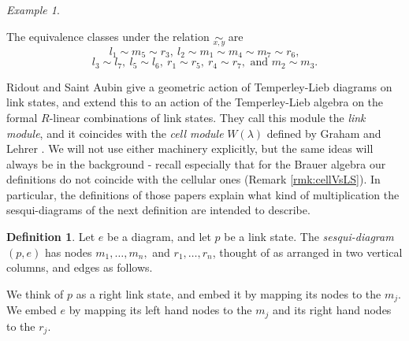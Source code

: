 \documentclass[12pt]{amsart}
\theoremstyle{plain}
\theoremstyle{definition} \newtheorem{definition}[theorem]{Definition}
\theoremstyle{plain}
\theoremstyle{plain} \newtheorem{proposition}[theorem]{Proposition}
\theoremstyle{plain} \newtheorem{conjecture}[theorem]{Conjecture}
\theoremstyle{plain} \newtheorem{corollary}[theorem]{Corollary}
\theoremstyle{remark} \newtheorem{claim}[theorem]{Claim}
\theoremstyle{remark} \newtheorem{remark}[theorem]{Remark}
\theoremstyle{remark} \newtheorem{example}[theorem]{Example}
\theoremstyle{remark} \newtheorem{comment}[theorem]{Comment}
\theoremstyle{definition} \newtheorem{question}[theorem]{Question}
\begin{document}
\begin{example}
\begin{center}
\quad
\end{center}

The equivalence classes under the relation $\underset{x,y}{\sim}$ are
$$l_1 \sim m_5 \sim r_3, \ l_2 \sim m_1 \sim m_4 \sim m_7 \sim r_6,$$
$$l_3 \sim l_7, \ l_5 \sim l_6, \ r_1 \sim r_5, \ r_4 \sim r_7,\textrm{ and } m_2 \sim m_3.$$ \end{example}

Ridout and Saint Aubin \cite{RidoutSaintAubin} give a geometric action of Temperley-Lieb diagrams on link states, and extend this to an action of the Temperley-Lieb algebra on the formal $R$-linear combinations of link states. They call this module the \emph{link module}, and it coincides with the \emph{cell module} $W(\lambda)$ defined by Graham and Lehrer \cite{GrahamLehrer}. We will not use either machinery explicitly, but the same ideas will always be in the background - recall especially that for the Brauer algebra our definitions do not coincide with the cellular ones (Remark \ref{rmk:cellVsLS}). In particular, the definitions of those papers explain what kind of multiplication the sesqui-diagrams of the next definition are intended to describe.

\begin{definition} \label{defSesqui} \cite{RidoutSaintAubin} Let $e$ be a diagram, and let $p$ be a link state. The \emph{sesqui-diagram} $(p,e)$ has nodes $m_1, \dots, m_n,$ and $r_1, \dots, r_n$, thought of as arranged in two vertical columns, and edges as follows.

We think of $p$ as a right link state, and embed it by mapping its nodes to the $m_j$. We embed $e$ by mapping its left hand nodes to the $m_j$ and its right hand nodes to the $r_j$.

\end{definition}
\end{document}
